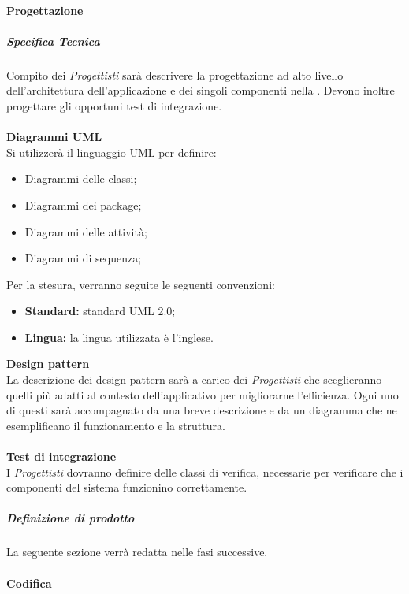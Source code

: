 			\paragraph{Progettazione}
				\subparagraph{Specifica Tecnica}
Compito dei \emph{Progettisti} sarà descrivere la progettazione ad alto livello dell'architettura dell'applicazione e dei singoli componenti nella \docNameVersionST. Devono inoltre progettare gli opportuni test di integrazione.\\ \\
					\noindent
					\textbf{Diagrammi UML}\\
Si utilizzerà il linguaggio UML per definire:
						\begin{itemize}
							\item Diagrammi delle classi;
							\item Diagrammi dei package;
							\item Diagrammi delle attività;
							\item Diagrammi di sequenza;
						\end{itemize}
Per la stesura, verranno seguite le seguenti convenzioni:
						\begin{itemize}
							\item \textbf{Standard:} standard UML 2.0;
							\item \textbf{Lingua:} la lingua utilizzata è l'inglese.
						\end{itemize}
					\textbf{Design pattern}\\
La descrizione dei design pattern sarà a carico dei \emph{Progettisti} che sceglieranno quelli più adatti al contesto dell'applicativo per migliorarne l'efficienza. Ogni uno di questi sarà accompagnato da una breve descrizione e da un diagramma che ne esemplificano il funzionamento e la struttura.\\ \\
					\textbf{Test di integrazione}\\
I \emph{Progettisti} dovranno definire delle classi di verifica, necessarie per verificare che i componenti del sistema funzionino correttamente.\\ 
				\subparagraph{Definizione di prodotto}
				
La seguente sezione verrà redatta nelle fasi successive.					

			\paragraph{Codifica}

